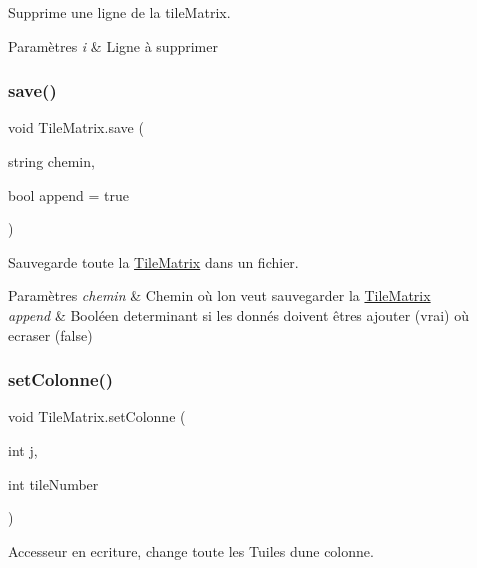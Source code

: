 Supprime une ligne de la tile\+Matrix. 


\begin{DoxyParams}{Paramètres}
{\em i} & Ligne à supprimer \\
\hline
\end{DoxyParams}
\mbox{\label{class_tile_matrix_ae0239badb424adde14ae390b25fcf32d}} 
\subsubsection{\texorpdfstring{save()}{save()}}
{\footnotesize\ttfamily void Tile\+Matrix.\+save (\begin{DoxyParamCaption}\item[{string}]{chemin,  }\item[{bool}]{append = {\ttfamily true} }\end{DoxyParamCaption})}



Sauvegarde toute la \hyperlink{class_tile_matrix}{Tile\+Matrix} dans un fichier. 


\begin{DoxyParams}{Paramètres}
{\em chemin} & Chemin où l\textquotesingle{}on veut sauvegarder la \hyperlink{class_tile_matrix}{Tile\+Matrix} \\
\hline
{\em append} & Booléen determinant si les donnés doivent êtres ajouter (vrai) où ecraser (false) \\
\hline
\end{DoxyParams}
\mbox{\label{class_tile_matrix_a646d11a4f74c0663bd772cf114d6fc5b}} 
\subsubsection{\texorpdfstring{set\+Colonne()}{setColonne()}}
{\footnotesize\ttfamily void Tile\+Matrix.\+set\+Colonne (\begin{DoxyParamCaption}\item[{int}]{j,  }\item[{int}]{tile\+Number }\end{DoxyParamCaption})}



Accesseur en ecriture, change toute les Tuiles d\textquotesingle{}une colonne. 


